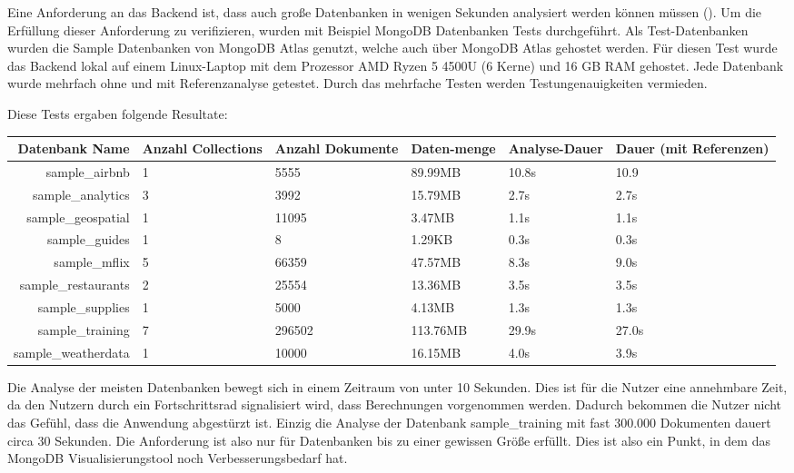Eine Anforderung an das Backend ist, dass auch große Datenbanken in wenigen Sekunden analysiert werden können müssen ().
Um die Erfüllung dieser Anforderung zu verifizieren, wurden mit Beispiel MongoDB Datenbanken Tests durchgeführt.
Als Test-Datenbanken wurden die Sample Datenbanken von MongoDB Atlas genutzt, welche auch über MongoDB Atlas gehostet werden.
Für diesen Test wurde das Backend lokal auf einem Linux-Laptop mit dem Prozessor AMD Ryzen 5 4500U (6 Kerne) und 16 GB RAM gehostet.
Jede Datenbank wurde mehrfach ohne und mit Referenzanalyse getestet.
Durch das mehrfache Testen werden Testungenauigkeiten vermieden.

Diese Tests ergaben folgende Resultate:

\begin{tabular}{ |r|m{1.5cm}|m{1.5cm}|m{2cm}|m{1.5cm}|m{2cm}| }
        \hline
        \textbf{Datenbank Name} & \textbf{Anzahl Collections} & \textbf{Anzahl Dokumente} & \textbf{Daten-menge} & \textbf{Analyse-Dauer} & \textbf{Dauer (mit Referenzen)}\\
        \hline
        sample\_airbnb & 1 & 5555 & 89.99MB & 10.8s & 10.9\\
        sample\_analytics & 3 & 3992 & 15.79MB & 2.7s & 2.7s\\
        sample\_geospatial & 1 & 11095 & 3.47MB & 1.1s & 1.1s\\
        sample\_guides & 1 & 8 & 1.29KB & 0.3s & 0.3s\\
        sample\_mflix & 5 & 66359 & 47.57MB & 8.3s & 9.0s\\
        sample\_restaurants & 2 & 25554 & 13.36MB & 3.5s & 3.5s\\
        sample\_supplies & 1 & 5000 & 4.13MB & 1.3s & 1.3s\\
        sample\_training & 7 & 296502 & 113.76MB & 29.9s & 27.0s\\
        sample\_weatherdata & 1 & 10000 & 16.15MB & 4.0s & 3.9s\\
        \hline
\end{tabular}

Die Analyse der meisten Datenbanken bewegt sich in einem Zeitraum von unter 10 Sekunden.
Dies ist für die Nutzer eine annehmbare Zeit, da den Nutzern durch ein Fortschrittsrad signalisiert wird, dass Berechnungen vorgenommen werden.
Dadurch bekommen die Nutzer nicht das Gefühl, dass die Anwendung abgestürzt ist.
Einzig die Analyse der Datenbank sample\_training mit fast 300.000 Dokumenten dauert circa 30 Sekunden.
Die Anforderung  ist also  nur für Datenbanken bis zu einer gewissen Größe erfüllt.
Dies ist also ein Punkt, in dem das MongoDB Visualisierungstool noch Verbesserungsbedarf hat.

